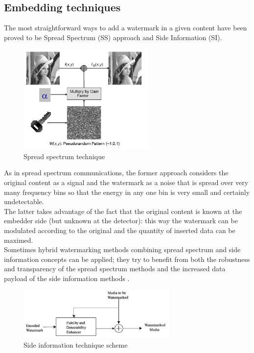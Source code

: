 \subsection{Embedding techniques}
The most straightforward ways to add a watermark in a given content have been proved to be Spread Spectrum (SS) approach and Side Information (SI).\\
\begin{figure}[h!]
\centering
\includegraphics[width=0.6\textwidth]{./img/ss.png}
\caption{\small{Spread spectrum technique}}
\label{fig:ss}
\end{figure}
As in spread spectrum communications, the former approach considers the original content as a signal and the watermark as a noise that is spread over very many frequency bins so that the energy in any one bin is very small and certainly undetectable\cite{COX}\cite{COX1}.\\
The latter takes advantage of the fact that the original content is known at the embedder side (but unknown at the detector): this way the watermark can be modulated  according to the original and the quantity of inserted data can be maximed\cite{COX2,SH, EG, COSTA}.\\

Sometimes hybrid watermarking methods combining spread spectrum and side information concepts can be applied; they try to benefit from both the robustness and transparency of the spread spectrum methods and the increased data payload of the side information methods \cite{QIM}\cite{QIM1}.
\begin{figure}[h!]
\centering
\includegraphics[width=0.7\textwidth]{./img/si.png}
\caption{\small{Side information technique scheme}}
\label{fig:si}
\end{figure}

